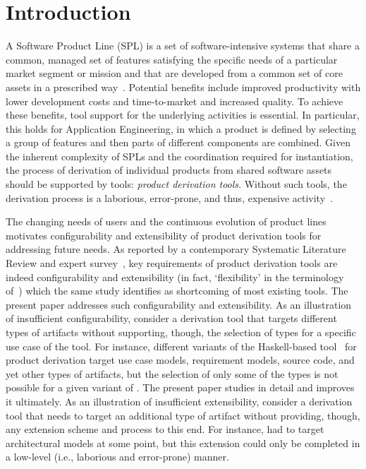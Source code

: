
\section{Introduction}
\label{introduction}



A Software Product Line (SPL) is a set of software-intensive systems that share a common, managed set of features satisfying the specific needs of a particular market segment or mission and that are developed from a common set of core assets in a prescribed way~\cite{spl-book}. Potential benefits include improved productivity with lower development costs and time-to-market and increased quality. To achieve these benefits, tool support for the underlying activities is essential. In particular, this holds for Application Engineering, in which a product is defined by selecting a group of features and then parts of different components are combined. Given the inherent complexity of SPLs and the coordination required for instantiation, the process of derivation of individual products from shared software assets should be supported by tools: \emph{product derivation tools}. Without such tools, the derivation process is a laborious, error-prone, and thus, expensive activity~\cite{griss,deelstra:2005}.



The changing needs of users and the continuous evolution of product lines motivates configurability and extensibility of product derivation tools for addressing future needs. As reported by a contemporary Systematic Literature Review and expert survey~\cite{ist-2010}, key requirements of product derivation tools are indeed configurability and extensibility (in fact, `flexibility' in the terminology of~\cite{ist-2010}) which the same study identifies as shortcoming of most existing tools. The present paper addresses such configurability and extensibility. As an illustration of insufficient configurability, consider a derivation tool that targets different types of artifacts without supporting, though, the selection of types for a specific use case of the tool. For instance, different variants of the Haskell-based \hp{} tool~\cite{rbonifacio:sbcars2009} for product derivation target use case models, requirement models, source code, and yet other types of artifacts, but the selection of only some of the types is not possible for a given variant of \hp. The present paper studies \hp{} in detail and improves it ultimately. As an illustration of insufficient extensibility, consider a derivation tool that needs to target an additional type of artifact without providing, though, any extension scheme and process to this end. For instance, \hp{} had to target architectural models at some point, but this extension could only be completed in a low-level (i.e., laborious and error-prone) manner.

